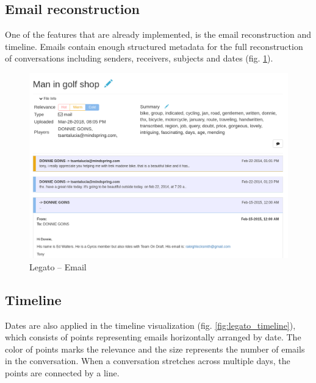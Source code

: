 \documentclass[
  digital, %
  notable,   %
  nolof,     %
  nolot,     %
  draft
]{fithesis3}
\begin{document}
\subsection*{Email reconstruction}
One of the features that are already implemented, is the email reconstruction and timeline.
Emails contain enough structured metadata for the full reconstruction of conversations including senders, receivers, subjects and dates (fig. \ref{fig:legato_email}).

\begin{figure}[h]
\caption{Legato -- Email}
\label{fig:legato_email}
\includegraphics[width=\textwidth]{img/Legato-Email}
\end{figure}

\subsection*{Timeline}
Dates are also applied in the timeline visualization (fig. \ref{fig:legato_timeline}), which consists of points representing emails horizontally arranged by date.
The color of points marks the relevance and the size represents the number of emails in the conversation.
When a conversation stretches across multiple days, the points are connected by a line.
\end{document}
